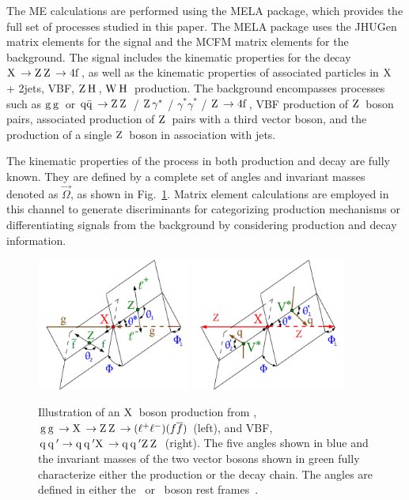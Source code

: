 The ME calculations are performed using the {\sc MELA} package, which provides the full set of processes studied in this paper.
The {\sc MELA} package uses the {\sc JHUGen} matrix elements for the signal and the {\sc MCFM} matrix elements for the background.
The signal includes the kinematic properties for the decay $\mathrm{X}\hspace{0.2em} \to \mathrm{Z}\hspace{0.2em}\mathrm{Z}\hspace{0.2em} \to 4 \textrm{f}\hspace{0.2em}$, as well as the kinematic properties of associated particles in $\mathrm{X}\hspace{0.2em}$ + 2jets, VBF, $\mathrm{Z}\hspace{0.2em}\mathrm{H}\hspace{0.2em}$, $\mathrm{W}\hspace{0.2em}\mathrm{H}\hspace{0.2em}$ production.
The background encompasses processes such as $\mathrm{g}\hspace{0.2em}\mathrm{g}\hspace{0.2em}$ or $\mathrm{q\bar{q}}\hspace{0.2em}\to\mathrm{Z}\hspace{0.2em}\mathrm{Z}\hspace{0.2em}$ / $\mathrm{Z}\hspace{0.2em}\gamma^*$ / $\gamma^*\gamma^*$ / $\mathrm{Z}\hspace{0.2em}\to 4 \textrm{f}\hspace{0.2em}$, VBF production of $\mathrm{Z}\hspace{0.2em}$ boson pairs, associated production of $\mathrm{Z}\hspace{0.2em}$ pairs with a third vector boson, and the production of a single $\mathrm{Z}\hspace{0.2em}$ boson in association with jets.

The kinematic properties of the process in both production and decay are fully known. They are defined by a complete set of angles and invariant masses denoted as $\vec\Omega$, as shown in Fig.~\ref{fig:decay}. Matrix element calculations are employed in this channel to generate discriminants for categorizing production mechanisms or differentiating signals from the background by considering production and decay information.
\begin{figure}[!htb]
    \centering
    \includegraphics[width=0.45\textwidth]{figures/HighMassSearches/Figure_001-a.pdf}
    \includegraphics[width=0.45\textwidth]{figures/HighMassSearches/Figure_001-b.pdf}
    \caption
    {
    Illustration of an $\mathrm{X}\hspace{0.2em}$ boson production from \ggF, $\mathrm{g}\hspace{0.2em}\mathrm{g}\hspace{0.2em}\to \mathrm{X}\hspace{0.2em}\to \mathrm{Z}\hspace{0.2em}\mathrm{Z}\hspace{0.2em}\to (\ell^+\ell^-)(f\overline{f})$ (left), and VBF, $\mathrm{q}\hspace{0.2em}{\ensuremath{\mathrm{q}}\hspace{0.2em}^\prime}\to \mathrm{q}\hspace{0.2em}{\ensuremath{\mathrm{q}}\hspace{0.2em}^\prime} \mathrm{X}\hspace{0.2em} \to \mathrm{q}\hspace{0.2em}{\ensuremath{\mathrm{q}}\hspace{0.2em}^\prime}\mathrm{Z}\hspace{0.2em}\mathrm{Z}\hspace{0.2em}$ (right). The five angles shown in blue and the invariant masses of the two vector bosons shown in green fully characterize either the production or the decay chain. The angles are defined in either the \PX\ or \PV\ boson rest frames~\cite{Gao:2010qx,Anderson:2013afp}.
    }
    \label{fig:decay}
\end{figure}

